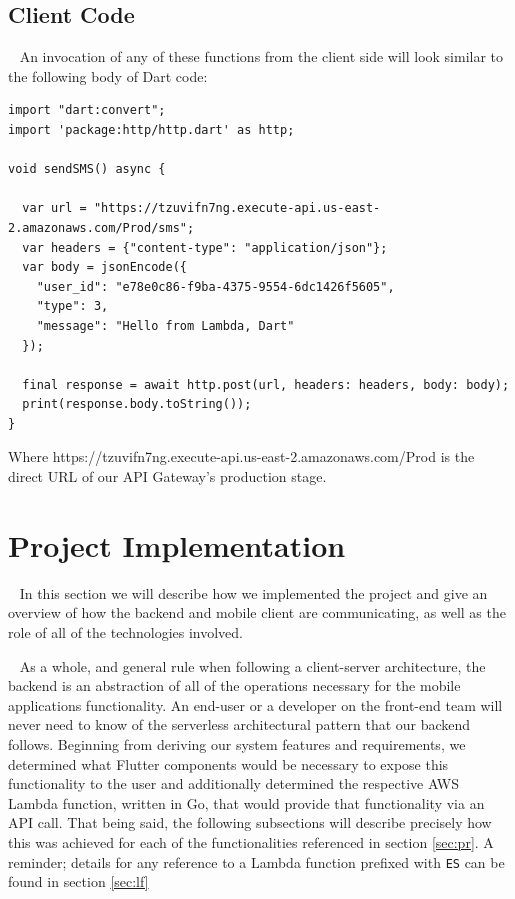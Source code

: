 \documentclass[10pt, a4paper]{article}
\begin{document}
\subsection{Client Code} 
\par ~ An invocation of any of these functions from the client side will look similar to the following body of Dart code:
\begin{lstlisting}
import "dart:convert";
import 'package:http/http.dart' as http;

void sendSMS() async {

  var url = "https://tzuvifn7ng.execute-api.us-east-2.amazonaws.com/Prod/sms";
  var headers = {"content-type": "application/json"};
  var body = jsonEncode({
    "user_id": "e78e0c86-f9ba-4375-9554-6dc1426f5605",
    "type": 3,
    "message": "Hello from Lambda, Dart"
  });

  final response = await http.post(url, headers: headers, body: body);
  print(response.body.toString());
}
\end{lstlisting}
Where https://tzuvifn7ng.execute-api.us-east-2.amazonaws.com/Prod is the direct URL of our API Gateway's production stage.

\section{Project Implementation}
\par ~ In this section we will describe how we implemented the project and give an overview of how the backend and mobile client are communicating, as well as the role of all of the technologies involved. 
\par ~ As a whole, and general rule when following a client-server architecture, the backend is an abstraction of all of the operations necessary for the mobile applications functionality. An end-user or a developer on the front-end team will never need to know of the serverless architectural pattern \cite{one} that our backend follows. Beginning from deriving our system features and requirements, we determined what Flutter components would be necessary to expose this functionality to the user and additionally determined the respective AWS Lambda function, written in Go, that would provide that functionality via an API call. That being said, the following subsections will describe precisely how this was achieved for each of the functionalities referenced in section \ref{sec:pr}. A reminder; details for any reference to a Lambda function prefixed with \texttt{ES} can be found in section \ref{sec:lf} 
\end{document}
